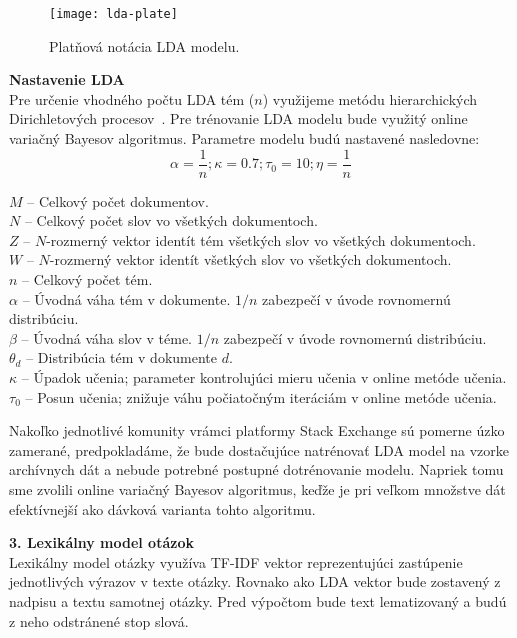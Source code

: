 \begin{figure}[H]\begin{center}
\texttt{[image: lda-plate]}
\caption{Platňová notácia LDA modelu.\footnotemark}\end{center}
\end{figure}

\begin{adjustwidth}{1cm}{1cm}
\textbf{Nastavenie LDA}\\
Pre určenie vhodného počtu LDA tém ($n$) využijeme metódu hierarchických Dirichletových procesov~\cite{Teh2006}.
Pre trénovanie LDA modelu bude využitý online variačný Bayesov algoritmus. Parametre modelu budú nastavené nasledovne:\\
$$\alpha = \frac{1}{n}; \kappa = 0.7; \tau_0 = 10; \eta = \frac{1}{n}$$

$M$ -- Celkový počet dokumentov. \\
$N$ -- Celkový počet slov vo všetkých dokumentoch. \\
$Z$ -- $N$-rozmerný vektor identít tém všetkých slov vo všetkých dokumentoch. \\
$W$ -- $N$-rozmerný vektor identít všetkých slov vo všetkých dokumentoch. \\
$n$ -- Celkový počet tém. \\
$\alpha$   -- Úvodná váha tém v dokumente. $1/n$ zabezpečí v úvode rovnomernú distribúciu.\\
$\beta$    -- Úvodná váha slov v téme. $1/n$ zabezpečí v úvode rovnomernú distribúciu.\\
$\theta_d$ -- Distribúcia tém v dokumente $d$. \\
$\kappa$   -- Úpadok učenia; parameter kontrolujúci mieru učenia v online metóde učenia. \\
$\tau_0$   -- Posun učenia; znižuje váhu počiatočným iteráciám v online metóde učenia.

Nakoľko jednotlivé komunity vrámci platformy Stack Exchange sú pomerne úzko zamerané, predpokladáme, že bude dostačujúce
natrénovať LDA model na vzorke archívnych dát a nebude potrebné postupné dotrénovanie modelu. Napriek tomu sme zvolili
online variačný Bayesov algoritmus, keďže je pri veľkom množstve dát efektívnejší ako dávková varianta tohto algoritmu.
\end{adjustwidth}

\textbf{3. Lexikálny model otázok}\\
Lexikálny model otázky využíva TF-IDF vektor reprezentujúci zastúpenie jednotlivých výrazov v texte otázky. Rovnako ako
LDA vektor bude zostavený z nadpisu a textu samotnej otázky. Pred výpočtom bude text lematizovaný a budú z neho odstránené
stop slová.

